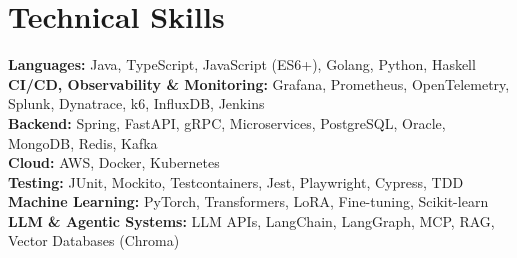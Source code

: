 \documentclass[letterpaper,11pt]{article}
\begin{document}
\section{Technical Skills}
\vspace{-2pt}
\begin{itemize}[leftmargin=0.15in, label={}]\small{\item{
\textbf{Languages:} Java, TypeScript, JavaScript (ES6+), Golang, Python, Haskell \\
\textbf{CI/CD, Observability \& Monitoring:} Grafana, Prometheus, OpenTelemetry, Splunk, Dynatrace, k6, InfluxDB, Jenkins \\
\textbf{Backend:} Spring, FastAPI, gRPC, Microservices, PostgreSQL, Oracle, MongoDB, Redis, Kafka \\
\textbf{Cloud:}  AWS, Docker, Kubernetes \\
\textbf{Testing:} JUnit, Mockito, Testcontainers, Jest, Playwright, Cypress, TDD\\
\textbf{Machine Learning:} PyTorch, Transformers, LoRA, Fine-tuning, Scikit-learn\\
\textbf{LLM \& Agentic Systems:} LLM APIs, LangChain, LangGraph, MCP, RAG, Vector Databases (Chroma)\\

}}
\end{itemize}
\end{document}
